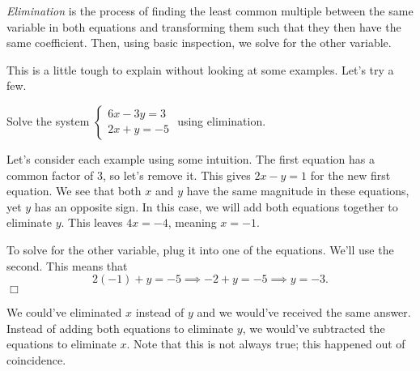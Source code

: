 \documentclass[lang=en,11pt]{elegantbook}
\begin{document}
\textit{Elimination} is the process of finding the least common multiple between the same variable in both equations and transforming them such that they then have the same coefficient.  Then, using basic inspection, we solve for the other variable.

This is a little tough to explain without looking at some examples.  Let's try a few.
\begin{example}
Solve the system $\begin{cases} 6x-3y=3 \\ 2x+y=-5 \end{cases}$ using elimination.
\end{example}
\begin{solution}
Let's consider each example using some intuition.  The first equation has a common factor of $3$, so let's remove it.  This gives $2x-y=1$ for the new first equation.  We see that both $x$ and $y$ have the same magnitude in these equations, yet $y$ has an opposite sign.  In this case, we will add both equations together to eliminate $y$.  This leaves $4x=-4$, meaning $x=-1$.

To solve for the other variable, plug it into one of the equations.  We'll use the second.  This means that $$2(-1)+y=-5 \implies -2+y=-5 \implies y=-3.$$ $\Box$
\end{solution}

\begin{remark}
We could've eliminated $x$ instead of $y$ and we would've received the same answer.  Instead of adding both equations to eliminate $y$, we would've subtracted the equations to eliminate $x$.  Note that this is not always true; this happened out of coincidence.  
\end{remark}
\end{document}
